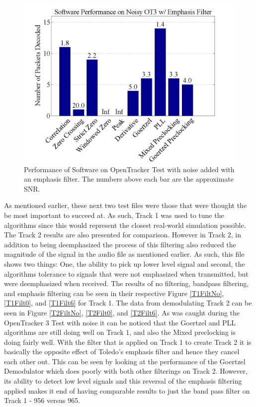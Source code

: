 \begin{figure}
  \centering
	\includegraphics[width=0.75\linewidth]{images/SoftwarePerformanceonNoisyOT3wEmphasisFilter.png} 
	\caption{Performance of Software on OpenTracker Test with noise added with an emphasis filter. The numbers above each bar are the approximate SNR.}
   \label{OTNoiseFilt6}
\end{figure}

As mentioned earlier, these next two test files were those that were thought the be most important to succeed at. As such, Track 1 was used to tune the algorithms since this would represent the closest real-world simulation possible. The Track 2 results are also presented for comparison. However in Track 2, in addition to being deemphasized the process of this filtering also reduced the magnitude of the signal in the audio file as mentioned earlier. As such, this file shows two things: One, the ability to pick up lower level signal and second, the algorithms tolerance to signals that were not emphasized when transmitted, but were deemphasized when received. The results of no filtering, bandpass filtering, and emphasis filtering can be seen in their respective Figure \ref{T1FiltNo}, \ref{T1Filt0}, and \ref{T1Filt6} for Track 1. The data from demodulating Track 2 can be seen in Figure \ref{T2FiltNo}, \ref{T2Filt0}, and \ref{T2Filt6}. As was caught during the OpenTracker 3 Test with noise it can be noticed that the Goertzel and PLL algorithms are still doing well on Track 1, and also the Mixed preclocking is doing fairly well. With the filter that is applied on Track 1 to create Track 2 it is basically the opposite effect of Toledo's emphasis filter and hence they cancel each other out. This can be seen by looking at the performance of the Goertzel Demodulator which does poorly with both other filterings on Track 2. However, its ability to detect low level signals and this reversal of the emphasis filtering applied makes it end of having comparable results to just the band pass filter on Track 1 - 956 versus 965. 

